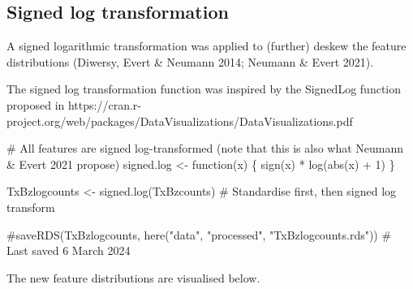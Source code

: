 \documentclass[
  letterpaper,
  DIV=11,
  numbers=noendperiod]{scrreprt}
\newenvironment{Shaded}{\begin{snugshade}}{\end{snugshade}}
\newcommand{\CommentTok}[1]{\textcolor[rgb]{0.37,0.37,0.37}{#1}}
\newcommand{\ControlFlowTok}[1]{\textcolor[rgb]{0.00,0.23,0.31}{#1}}
\newcommand{\DecValTok}[1]{\textcolor[rgb]{0.68,0.00,0.00}{#1}}
\newcommand{\FunctionTok}[1]{\textcolor[rgb]{0.28,0.35,0.67}{#1}}
\newcommand{\NormalTok}[1]{\textcolor[rgb]{0.00,0.23,0.31}{#1}}
\newcommand{\OtherTok}[1]{\textcolor[rgb]{0.00,0.23,0.31}{#1}}
\newcommand{\SpecialCharTok}[1]{\textcolor[rgb]{0.37,0.37,0.37}{#1}}
\begin{document}
\subsection{Signed log transformation}\label{signed-log-transformation}

A signed logarithmic transformation was applied to (further) deskew the
feature distributions (Diwersy, Evert \& Neumann 2014; Neumann \& Evert
2021).

The signed log transformation function was inspired by the SignedLog
function proposed in
https://cran.r-project.org/web/packages/DataVisualizations/DataVisualizations.pdf

\begin{Shaded}
\begin{Highlighting}[]
\CommentTok{\# All features are signed log{-}transformed (note that this is also what Neumann \& Evert 2021 propose)}
\NormalTok{signed.log }\OtherTok{\textless{}{-}} \ControlFlowTok{function}\NormalTok{(x) \{}
  \FunctionTok{sign}\NormalTok{(x) }\SpecialCharTok{*} \FunctionTok{log}\NormalTok{(}\FunctionTok{abs}\NormalTok{(x) }\SpecialCharTok{+} \DecValTok{1}\NormalTok{)}
\NormalTok{  \}}

\NormalTok{TxBzlogcounts }\OtherTok{\textless{}{-}} \FunctionTok{signed.log}\NormalTok{(TxBzcounts) }\CommentTok{\# Standardise first, then signed log transform}

\CommentTok{\#saveRDS(TxBzlogcounts, here("data", "processed", "TxBzlogcounts.rds")) \# Last saved 6 March 2024}
\end{Highlighting}
\end{Shaded}

The new feature distributions are visualised below.
\end{document}
